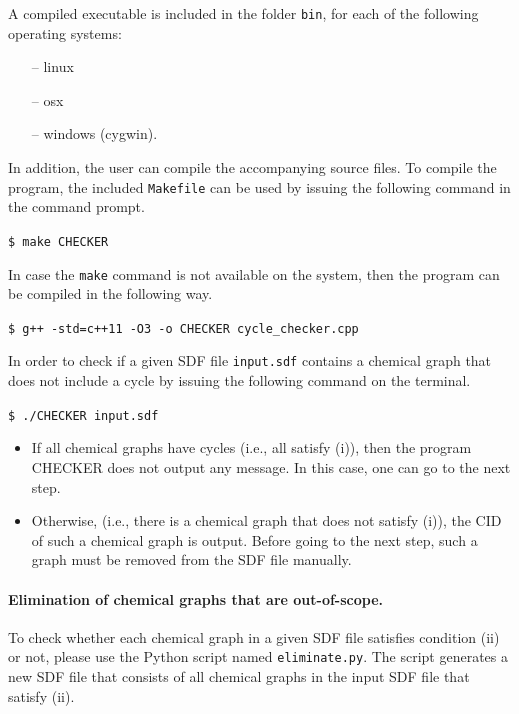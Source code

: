 \documentclass[11pt,titlepage,dvipdfmx,twoside]{book}
\begin{document}
A compiled executable is included in the folder {\tt bin},
for each of the following operating systems:
%
\begin{itemize}
 \item [--] linux
 \item [--] osx
 \item [--] windows (cygwin).
\end{itemize}

In addition, the user can compile the accompanying source files.
To compile the program, the included {\tt Makefile}
can be used by issuing the following command in the command prompt.
\begin{oframed}
{\small
\verb|$ make CHECKER|
}
\end{oframed}
%
In case the {\tt make} command is not available on the system,
then the program can be compiled in the following way.
\begin{oframed}
{\small
\verb|$ g++ -std=c++11 -O3 -o CHECKER cycle_checker.cpp|
}
\end{oframed}

In order to check if a given
SDF file {\tt input.sdf} contains a chemical graph that does not include
a cycle by issuing the following command on the terminal.
\begin{oframed}
{\small
\verb|$ ./CHECKER input.sdf|
}
\end{oframed}


\begin{itemize}
\item If all chemical graphs have cycles
  (i.e., all satisfy (i)),
  then the program CHECKER does not output any message.
  In this case, one can go to the next step. 
\item Otherwise, (i.e., there is a chemical graph that does not satisfy (i)),
  the CID of such a chemical graph is output.
  Before going to the next step,
  such a graph must be removed from the SDF file manually.  
\end{itemize}

\paragraph{Elimination of chemical graphs that are out-of-scope.}
To check whether each chemical graph in a given SDF file
satisfies condition (ii) or not,
please use the Python script named 
{\tt eliminate.py}.
The script generates a new SDF file
that consists of all chemical graphs in the input SDF file
that satisfy (ii). 
\end{document}
